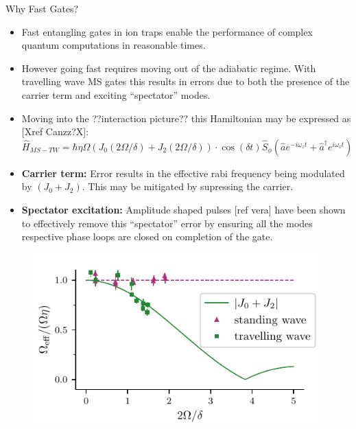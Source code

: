 \documentclass[final]{beamer}
\begin{document}
\begin{frame}{}
\begin{center}
\begin{columns}[t]
\begin{column}{0.49\textwidth}
\begin{alertblock}{Why Fast Gates?}
\begin{itemize}
      \item Fast entangling gates in ion traps enable the
            performance of complex quantum computations in reasonable times.\vspace{0.8em}

      \item However going fast requires moving out of the adiabatic
            regime. With travelling wave MS gates this results in errors
            due to both the presence of the carrier term and exciting
            ``spectator'' modes.\vspace{0.4em}

      \item Moving into the ??interaction picture?? this Hamiltonian
            may be expressed as [Xref Canzz?X]:
      \Large$$ \hat{H}_{MS-TW} = \hbar\eta\Omega(J_0(2\Omega/\delta) + J_2(2\Omega/\delta))\cdot \cos{(\delta t)}\hat{S}_{\phi}(\hat{a}e^{-i\omega_zt} + \hat{a}^\dagger e^{i\omega_zt})$$\normalsize
      \end{itemize}
      \begin{minipage}{0.58\textwidth}
      \begin{itemize}
      \item \textbf{Carrier term:} Error results in the effective rabi
        frequency being modulated by $(J_0 + J_2)$. This may be
        mitigated by supressing the carrier.\vspace{0.8em}

      \item \textbf{Spectator excitation:} Amplitude shaped pulses
        [ref vera] have been shown to effectively remove this
        ``spectator'' error by ensuring all the modes respective phase
        loops are closed on completion of the gate.\\
      \end{itemize}
      \end{minipage}
      \begin{minipage}{0.38\textwidth}
      \begin{figure}
        \includegraphics[width=0.98\textwidth]{./figs/J0J2.pdf}
      \end{figure}
      \end{minipage}


\end{alertblock}
\end{column}
\end{columns}
\end{center}
\end{frame}
\end{document}
